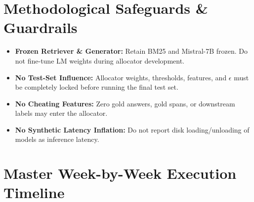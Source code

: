 \documentclass[11pt,a4paper]{article}
\begin{document}
\section{Methodological Safeguards \& Guardrails}
\begin{warningbox}
\begin{itemize}
    \item \textbf{Frozen Retriever \& Generator:} Retain BM25 and Mistral-7B frozen. Do not fine-tune LM weights during allocator development.
    \item \textbf{No Test-Set Influence:} Allocator weights, thresholds, features, and $\epsilon$ must be completely locked before running the final test set.
    \item \textbf{No Cheating Features:} Zero gold answers, gold spans, or downstream labels may enter the allocator.
    \item \textbf{No Synthetic Latency Inflation:} Do not report disk loading/unloading of models as inference latency.
\end{itemize}
\end{warningbox}

\section{Master Week-by-Week Execution Timeline}
\end{document}

